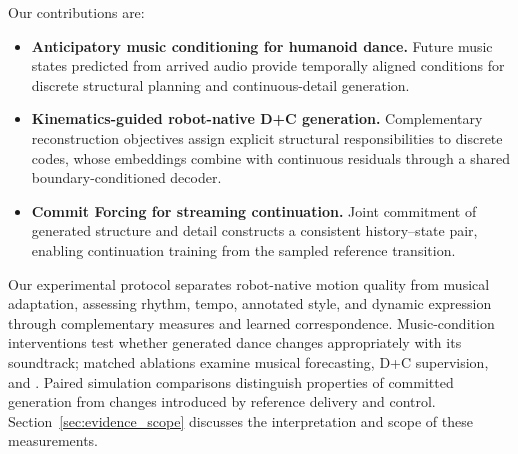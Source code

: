 Our contributions are:
\begin{itemize}
    \setlength{\itemsep}{2pt}
    \setlength{\parsep}{0pt}
    \setlength{\topsep}{3pt}
    \setlength{\partopsep}{0pt}
    \item \textbf{Anticipatory music conditioning for humanoid dance.}
    Future music states predicted from arrived audio provide temporally
    aligned conditions for discrete structural planning and
    continuous-detail generation.
    \item \textbf{Kinematics-guided robot-native D+C generation.}
    Complementary reconstruction objectives assign explicit structural
    responsibilities to discrete codes, whose embeddings combine with
    continuous residuals through a shared boundary-conditioned decoder.
    \item \textbf{Commit Forcing for streaming continuation.}
    Joint commitment of generated structure and detail constructs
    a consistent history--state pair, enabling continuation training
    from the sampled reference transition.
\end{itemize}


Our experimental protocol separates robot-native motion quality from
musical adaptation, assessing rhythm, tempo, annotated style, and dynamic
expression through complementary measures and learned correspondence.
Music-condition interventions
test whether generated dance changes appropriately with its soundtrack;
matched ablations examine musical forecasting, D+C supervision, and
\cof{}. Paired simulation comparisons distinguish properties of committed
generation from changes introduced by reference delivery and control.
Section~\ref{sec:evidence_scope} discusses the interpretation and scope
of these measurements.
